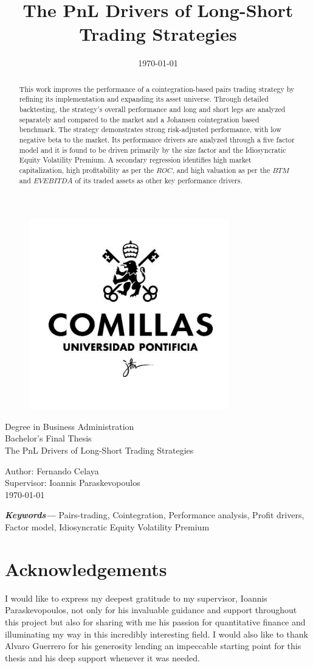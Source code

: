 \documentclass[12pt,a4paper,twoside]{article}
\title{The PnL Drivers of Long-Short Trading Strategies}
\date{\today}
\providecommand{\keywords}[1]
{
  \small	
  \textbf{\textit{Keywords---}} #1
}
\begin{document}
\pagestyle{empty}
\begin{titlepage}
  \begin{figure}
    \centering
    \includegraphics[width=0.3\linewidth]{assets/logo-comillas.png}
  \end{figure}
  \centering
  \Large 
  Degree in Business Administration \\ Bachelor's Final Thesis\\[36px]
  \Huge 
  The PnL Drivers of Long-Short Trading Strategies\\
  \Large
  \raggedright
  \vspace*{\fill}
  Author: Fernando Celaya\\
  Supervisor: Ioannis Paraskevopoulos\\
  \today

\end{titlepage}
\newpage

\begin{abstract}
  This work improves the performance of a cointegration-based pairs trading strategy by refining its implementation and expanding its asset universe. Through detailed backtesting, the strategy's overall performance and long and short legs are analyzed separately and compared to the market and a Johansen cointegration based benchmark. The strategy demonstrates strong risk-adjusted performance, with low negative beta to the market. Its performance drivers are analyzed through a five factor model and it is found to be driven primarily by the size factor and the Idiosyncratic Equity Volatility Premium. A secondary regression identifies high market capitalization, high profitability as per the $ROC$, and high valuation as per the $BTM$ and $EVEBITDA$ of its traded assets as other key performance drivers. 
\end{abstract}
\keywords{Pairs-trading, Cointegration, Performance analysis, Profit drivers, Factor model, Idiosyncratic Equity Volatility Premium}
\newpage

\section*{Acknowledgements}
I would like to express my deepest gratitude to my supervisor, Ioannis Paraskevopoulos, not only for his invaluable guidance and support throughout this project but also for sharing with me his passion for quantitative finance and illuminating my way in this incredibly interesting field. I would also like to thank Alvaro Guerrero for his generosity lending an impeccable starting point for this thesis and his deep support whenever it was needed. 
\newpage
\end{document}
